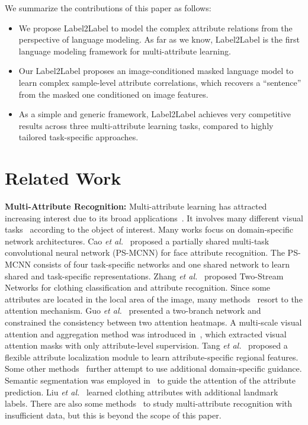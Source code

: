 \documentclass[runningheads]{llncs}
\begin{document}
We summarize the contributions of this paper as follows:
\begin{itemize}
\item
  We propose Label2Label to model the complex attribute relations from the perspective of language modeling. As far as we know, Label2Label is the first language modeling framework for multi-attribute learning.
\item
  Our Label2Label proposes an image-conditioned masked language model to learn complex sample-level attribute correlations, which recovers a ``sentence'' from the masked one conditioned on image features.
\item
  As a simple and generic framework, Label2Label achieves very competitive results across three multi-attribute learning tasks, compared to highly tailored task-specific approaches.
\end{itemize}




\section{Related Work}

\textbf{Multi-Attribute Recognition:} Multi-attribute learning has attracted increasing interest due to its broad applications~\cite{cao2018partially,li2018richly,ak2018learning}. It involves many different visual tasks~\cite{hand2017attributes,jia2021spatial,liu2016deepfashion} according to the object of interest. Many works focus on domain-specific network architectures. Cao \emph{et al.}~\cite{cao2018partially} proposed a partially shared multi-task convolutional neural network (PS-MCNN) for face attribute recognition. The PS-MCNN consists of four task-specific networks and one shared network to learn shared and task-specific representations.
Zhang \emph{et al.}~\cite{zhang2020texture} proposed Two-Stream Networks for clothing classification and attribute recognition.
Since some attributes are located in the local area of the image, many methods~\cite{guo2019visual,sarafianos2018deep,tang2019improving} resort to the attention mechanism. Guo \emph{et al.}~\cite{guo2019visual} presented a two-branch network and constrained the consistency between two attention heatmaps. A multi-scale visual attention and aggregation method was introduced in~\cite{sarafianos2018deep}, which extracted visual attention masks with only attribute-level supervision. Tang \emph{et al.}~\cite{tang2019improving} proposed a flexible attribute localization module to learn attribute-specific regional features. Some other methods~\cite{kalayeh2017improving,liu2016deepfashion} further attempt to use additional domain-specific guidance. Semantic segmentation was employed in~\cite{kalayeh2017improving} to guide the attention of the attribute prediction. 
Liu \emph{et al.}~\cite{liu2016deepfashion} learned clothing attributes with additional landmark labels. There are also some methods~\cite{zhao2019recognizing,shu2021learning} to study multi-attribute recognition with insufficient data, but this is beyond the scope of this paper.
\end{document}
